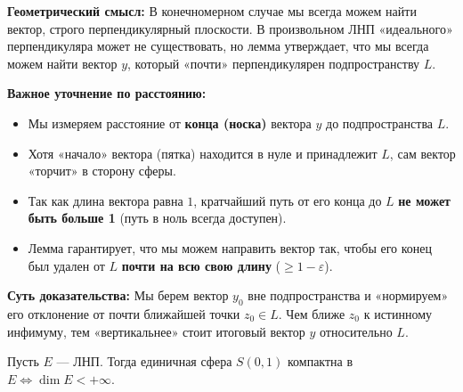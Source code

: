 \begin{idea}
	\textbf{Геометрический смысл:} В конечномерном случае мы всегда можем найти вектор, строго перпендикулярный плоскости. В произвольном ЛНП «идеального» перпендикуляра может не существовать, но лемма утверждает, что мы всегда можем найти вектор $y$, который «почти» перпендикулярен подпространству $L$.
	
	\textbf{Важное уточнение по расстоянию:}
	\begin{itemize}
		\item Мы измеряем расстояние от \textbf{конца (носка)} вектора $y$ до подпространства $L$. 
		\item Хотя «начало» вектора (пятка) находится в нуле и принадлежит $L$, сам вектор «торчит» в сторону сферы. 
		\item Так как длина вектора равна $1$, кратчайший путь от его конца до $L$ \textbf{не может быть больше 1} (путь в ноль всегда доступен).
		\item Лемма гарантирует, что мы можем направить вектор так, чтобы его конец был удален от $L$ \textbf{почти на всю свою длину} ($\geqslant 1 - \varepsilon$).
	\end{itemize}
	
	\textbf{Суть доказательства:} Мы берем вектор $y_0$ вне подпространства и «нормируем» его отклонение от почти ближайшей точки $z_0 \in L$. Чем ближе $z_0$ к истинному инфимуму, тем «вертикальнее» стоит итоговый вектор $y$ относительно $L$.
\end{idea}

\begin{theorem}\label{thm4.1}
	Пусть $E$ --- ЛНП. Тогда единичная сфера $S(0, 1)$ компактна в $E \Leftrightarrow \dim E < +\infty$.
\end{theorem}

